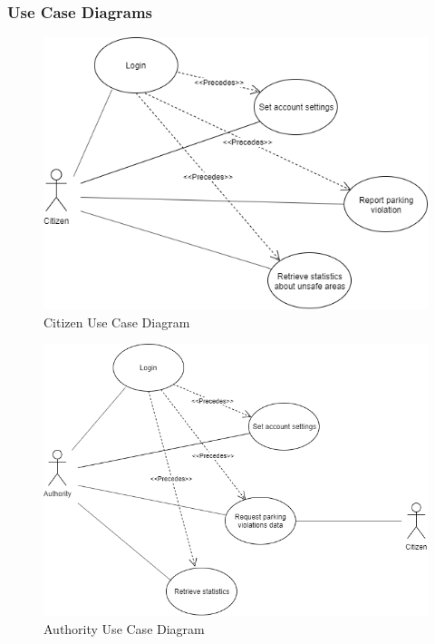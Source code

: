 \documentclass{article}
\begin{document}
\subsubsection{Use Case Diagrams}
\begin{figure}[h!]
    \centering
    \includegraphics[scale=0.5]{img/use_case_diagrams/citizen.png}
    \caption{Citizen Use Case Diagram}
\end{figure}
\clearpage
\begin{figure}[h!]
    \centering
    \includegraphics[scale=0.5]{img/use_case_diagrams/authority.png}
    \caption{Authority Use Case Diagram}
\end{figure}
\end{document}
